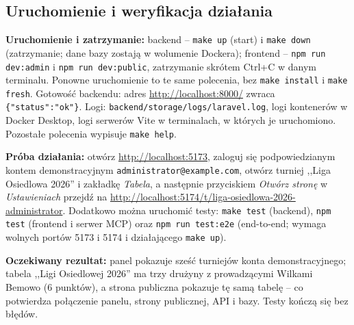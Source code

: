 \documentclass[11pt,a4paper,oneside]{article}
\newif\ifpodpowiedzi
\newcommand{\podpowiedz}[1]{\ifpodpowiedzi\par\begingroup\small\color{hintcolor}\textit{Wskazówka: #1}\par\endgroup\fi}
\begin{document}
\subsection{Uruchomienie i weryfikacja działania}
\podpowiedz{Opisz pierwsze uruchomienie, zatrzymanie i ponowne uruchomienie rozwiązania. Podaj sposób sprawdzenia gotowości komponentów, lokalizację logów i krótki scenariusz potwierdzający poprawność instalacji. Wskaż dane potrzebne do próby oraz konkretny oczekiwany rezultat. Dla złożonego projektu sprawdź także połączenia między komponentami.}
\textbf{Uruchomienie i zatrzymanie:} backend -- \texttt{make up} (start) i \texttt{make down} (zatrzymanie; dane bazy zostają w wolumenie Dockera); frontend -- \texttt{npm run dev:admin} i \texttt{npm run dev:public}, zatrzymanie skrótem Ctrl+C w danym terminalu. Ponowne uruchomienie to te same polecenia, bez \texttt{make install} i \texttt{make fresh}. Gotowość backendu: adres \url{http://localhost:8000/} zwraca \texttt{\{"status":"ok"\}}. Logi: \texttt{backend/storage/logs/laravel.log}, logi kontenerów w Docker Desktop, logi serwerów Vite w terminalach, w których je uruchomiono. Pozostałe polecenia wypisuje \texttt{make help}.\par
\textbf{Próba działania:} otwórz \url{http://localhost:5173}, zaloguj się podpowiedzianym kontem demonstracyjnym \texttt{administrator@example.com}, otwórz turniej ,,Liga Osiedlowa 2026'' i zakładkę \emph{Tabela}, a następnie przyciskiem \emph{Otwórz stronę} w \emph{Ustawieniach} przejdź na \url{http://localhost:5174/t/liga-osiedlowa-2026-administrator}. Dodatkowo można uruchomić testy: \texttt{make test} (backend), \texttt{npm test} (frontend i serwer MCP) oraz \texttt{npm run test:e2e} (end-to-end; wymaga wolnych portów 5173 i 5174 i działającego \texttt{make up}).\par
\textbf{Oczekiwany rezultat:} panel pokazuje sześć turniejów konta demonstracyjnego; tabela ,,Ligi Osiedlowej 2026'' ma trzy drużyny z prowadzącymi Wilkami Bemowo (6 punktów), a strona publiczna pokazuje tę samą tabelę -- co potwierdza połączenie panelu, strony publicznej, API i bazy. Testy kończą się bez błędów.
\end{document}
